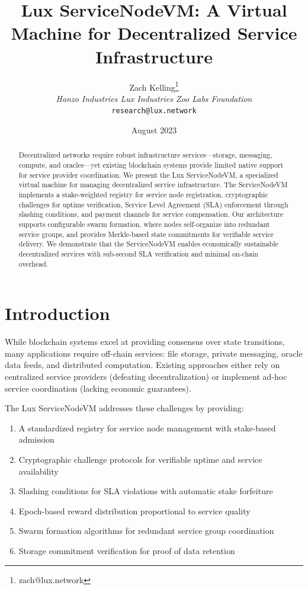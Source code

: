 \documentclass[11pt,a4paper]{article}
\title{\textbf{Lux ServiceNodeVM: A Virtual Machine for Decentralized Service Infrastructure}}
\author{Zach Kelling\thanks{zach@lux.network} \\ \textit{Hanzo Industries \quad Lux Industries \quad Zoo Labs Foundation} \\ \texttt{research@lux.network}}
\date{August 2023}
\begin{document}
\maketitle

\begin{abstract}
Decentralized networks require robust infrastructure services---storage, messaging, compute, and oracles---yet existing blockchain systems provide limited native support for service provider coordination. We present the Lux ServiceNodeVM, a specialized virtual machine for managing decentralized service infrastructure. The ServiceNodeVM implements a stake-weighted registry for service node registration, cryptographic challenges for uptime verification, Service Level Agreement (SLA) enforcement through slashing conditions, and payment channels for service compensation. Our architecture supports configurable swarm formation, where nodes self-organize into redundant service groups, and provides Merkle-based state commitments for verifiable service delivery. We demonstrate that the ServiceNodeVM enables economically sustainable decentralized services with sub-second SLA verification and minimal on-chain overhead.
\end{abstract}

\section{Introduction}

While blockchain systems excel at providing consensus over state transitions, many applications require off-chain services: file storage, private messaging, oracle data feeds, and distributed computation. Existing approaches either rely on centralized service providers (defeating decentralization) or implement ad-hoc service coordination (lacking economic guarantees).

The Lux ServiceNodeVM addresses these challenges by providing:

\begin{enumerate}
    \item A standardized registry for service node management with stake-based admission
    \item Cryptographic challenge protocols for verifiable uptime and service availability
    \item Slashing conditions for SLA violations with automatic stake forfeiture
    \item Epoch-based reward distribution proportional to service quality
    \item Swarm formation algorithms for redundant service group coordination
    \item Storage commitment verification for proof of data retention
\end{enumerate}
\end{document}
